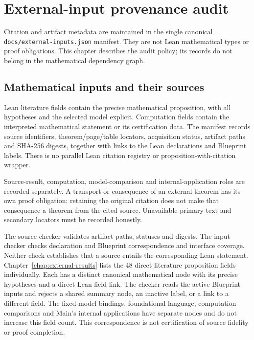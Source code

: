\chapter{External-input provenance audit}
\label{chap:provenance-audit}

Citation and artifact metadata are maintained in the single canonical
\texttt{docs/external-inputs.json} manifest. They are not Lean mathematical
types or proof obligations. This chapter describes the audit policy; its
records do not belong in the mathematical dependency graph.

\section{Mathematical inputs and their sources}

Lean literature fields contain the precise mathematical proposition, with
all hypotheses and the selected model explicit. Computation fields contain
the interpreted mathematical statement or its certification data. The
manifest records source identifiers, theorem/page/table locators, acquisition
status, artifact paths and SHA-256 digests, together with links to the Lean
declarations and Blueprint labels. There is no parallel Lean citation
registry or proposition-with-citation wrapper.

Source-result, computation, model-comparison and internal-application roles
are recorded separately. A transport or consequence of an external theorem
has its own proof obligation; retaining the original citation does not make
that consequence a theorem from the cited source. Unavailable primary text
and secondary locators must be recorded honestly.

The source checker validates artifact paths, statuses and digests. The input
checker checks declaration and Blueprint correspondence and interface coverage.
Neither check establishes that a source entails the corresponding Lean
statement. Chapter~\ref{chap:external-results} lists the 48 direct
literature proposition fields individually. Each has a distinct canonical
mathematical node with its precise hypotheses and a direct Lean field link.
The checker reads the active Blueprint inputs and rejects a shared summary
node, an inactive label, or a link to a different field. The fixed-model
bindings, foundational language, computation comparisons and Main's internal
applications have separate nodes and do not increase this field count.
This correspondence is not certification of source fidelity or proof completion.


